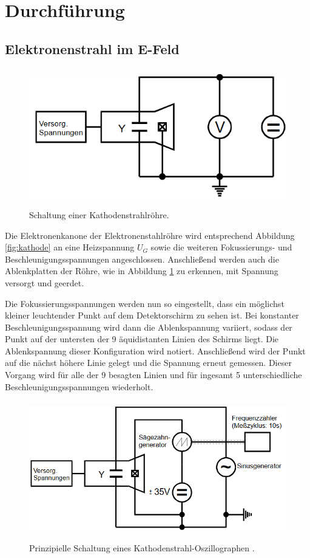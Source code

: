 \section{Durchführung}
\label{sec:Durchführung}

\subsection{Elektronenstrahl im E-Feld}
\begin{figure}[H]
  \centering
  \includegraphics[height=6cm]{Elektronenstrahlroehre_Schaltung.PNG}
  \caption{Schaltung einer Kathodenstrahlröhre. \cite{sample}}
  \label{fig:Schaltung}
\end{figure}

Die Elektronenkanone der Elektronenstahlröhre wird entsprechend Abbildung \ref{fig:kathode}
an eine Heizspannung $U_G$ sowie die weiteren Fokussierungs- und Beschleunigungsspannungen angeschlossen.
Anschließend werden auch die Ablenkplatten der Röhre, wie in Abbildung \ref{fig:Schaltung} zu erkennen, mit Spannung
versorgt und geerdet.

Die Fokussierungsspannungen werden nun so eingestellt, dass ein möglichst kleiner leuchtender Punkt auf dem
Detektorschirm zu sehen ist. Bei konstanter Beschleunigungsspannung wird dann die Ablenkspannung variiert, sodass
der Punkt auf der untersten der 9 äquidistanten Linien des Schirms liegt. Die Ablenkspannung dieser Konfiguration wird
notiert. Anschließend wird der Punkt auf die nächst höhere Linie gelegt und die Spannung erneut gemessen.
Dieser Vorgang wird für alle der 9 besagten Linien und für ingesamt 5 unterschiedliche Beschleunigungsspannungen wiederholt.

\begin{figure}[H]
  \centering
  \includegraphics[height=6cm]{Oszilloskop_Schaltung.PNG}
  \caption{Prinzipielle Schaltung eines Kathodenstrahl-Oszillographen . \cite{sample}}
  \label{fig:Schaltung1}
\end{figure}

